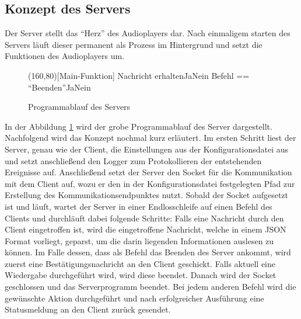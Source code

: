 \subsection{Konzept des Servers}

Der Server stellt das \enquote{Herz} des Audioplayers dar. Nach einmaligem
starten des Servers läuft dieser permanent als Prozess im Hintergrund und
setzt die Funktionen des Audioplayers um.

\begin{figure}[H]
    \begin{struktogramm}(160,80)[Main-Funktion] 
        	 {Nachricht erhalten}{Ja}{Nein}
        	     {Befehl == \enquote{Beenden}}{Ja}{Nein}
        	    	\change
        	    \ifend
        		\change
        	\ifend
        \whileend
    \end{struktogramm} 
\caption{Programmablauf des Servers} 
\label{lst:server_ablauf} 
\end{figure}

In der Abbildung \ref{lst:server_ablauf} wird der grobe Programmablauf des
Server dargestellt. Nachfolgend wird das Konzept nochmal kurz erläutert.
\newline
Im ersten Schritt liest der Server, genau wie der Client, die
Einstellungen aus der Konfigurationsdatei aus und setzt anschließend den Logger
zum Protokollieren der entstehenden Ereignisse auf. Anschließend setzt der
Server den Socket für die Kommunikation mit dem Client auf, wozu er den in der
Konfigurationsdatei festgelegten Pfad zur Erstellung des
Kommunikationsendpunktes nutzt. Sobald der Socket aufgesetzt ist und läuft,
wartet der Server in einer Endlosschleife auf einen Befehl des Clients und
durchläuft dabei folgende Schritte: \newline
Falls eine Nachricht durch den Client eingetroffen ist, wird die
eingetroffene Nachricht, welche in einem \ac{JSON} Format vorliegt,
geparst, um die darin liegenden Informationen auslesen zu können. Im Falle
dessen, dass als Befehl das Beenden des Server ankommt, wird zuerst eine
Bestätigungsnachricht an den Client geschickt. Falls aktuell eine Wiedergabe
durchgeführt wird, wird diese beendet. Danach wird der Socket geschlossen und
das Serverprogramm beendet. Bei jedem anderen Befehl wird die gewünschte Aktion
durchgeführt und nach erfolgreicher Ausführung eine Statusmeldung an den Client
zurück gesendet.
	


